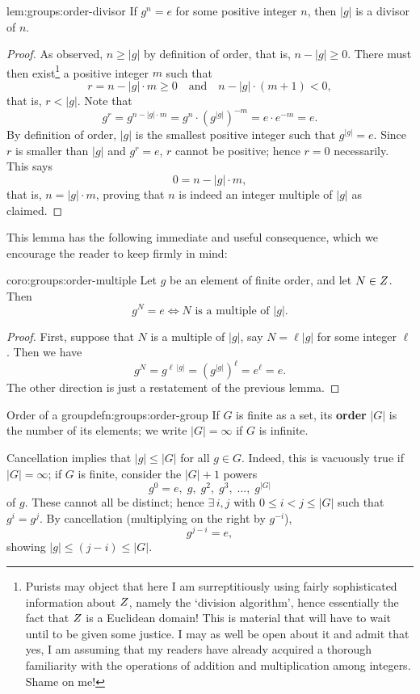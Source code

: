 \begin{lem}{}{lem:groups:order-divisor}
  If $g^n = e$ for some positive integer $n$, then $|g|$ is a divisor
  of $n$.
\end{lem}
\begin{proof}
  As observed, $n \geq |g|$ by definition of order, that is,
  $n - |g| \geq 0$.  There must then exist\footnote{Purists may object
    that here I am surreptitiously using fairly sophisticated
    information about $Z$, namely the `division algorithm', hence
    essentially the fact that $Z$ is a Euclidean domain! This is
    material that will have to wait until  to be
    given some justice. I may as well be open about it and admit that
    yes, I am assuming that my readers have already acquired a
    thorough familiarity with the operations of addition and
    multiplication among integers. Shame on me!} a positive integer
  $m$ such that
  \[
    r = n - |g| \cdot m \geq 0 \quad \text{and} \quad n - |g| \cdot
    (m+1) < 0,
  \]
  that is, $r < |g|$. Note that
  \[
    g^r = g^{n - |g| \cdot m} = g^n \cdot (g^{|g|})^{-m} = e \cdot
    e^{-m} = e.
  \]
  By definition of order, $|g|$ is the smallest positive integer such
  that $g^{|g|} = e$. Since $r$ is smaller than $|g|$ and $g^r = e$,
  $r$ cannot be positive; hence $r = 0$ necessarily. This says
  \[
    0 = n - |g| \cdot m,
  \]
  that is, $n = |g| \cdot m$, proving that $n$ is indeed an integer
  multiple of $|g|$ as claimed.
\end{proof}

This lemma has the following immediate and useful consequence, which
we encourage the reader to keep firmly in mind:

\begin{coro}{}{coro:groups:order-multiple}
  Let $g$ be an element of finite order, and let $N \in Z$. Then
  \[
    g^N = e \iff N \text{ is a multiple of } |g|.
  \]
\end{coro}
\begin{proof}
  First, suppose that $N$ is a multiple of $|g|$, say $N = \ell |g|$
  for some integer $\ell$.  Then we have
  \[
    g^N = g^{\ell\ |g|} = (g^{|g|})^{\ell} = e^\ell = e.
  \] The other direction is just a restatement of the previous lemma.
\end{proof}
\begin{defn}{Order of a group}{defn:groups:order-group}
  If $G$ is finite as a set, its \textbf{order} $|G|$ is the number of
  its elements; we write $|G| = \infty$ if $G$ is infinite.
\end{defn}
Cancellation implies that $|g| \leq |G|$ for all $g \in G$. Indeed,
this is vacuously true if $|G| = \infty$; if $G$ is finite, consider
the $|G|+1$ powers
\[
  g^0 = e,\; g,\; g^2,\; g^3,\; \ldots,\; g^{|G|}
\]
of $g$. These cannot all be distinct; hence $\exists\, i, j$ with
$0 \leq i < j \leq |G|$ such that $g^i = g^j$. By cancellation
(multiplying on the right by $g^{-i}$),
\[
  g^{j-i} = e,
\]
showing $|g| \leq (j-i) \leq |G|$.

